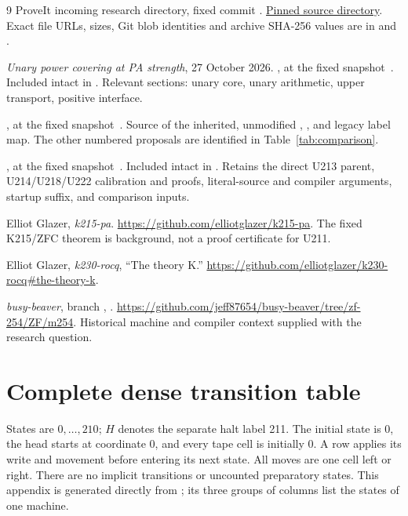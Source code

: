 \documentclass[11pt,a4paper]{article}
\begin{document}
\begin{thebibliography}{9}
 ProveIt incoming research directory, fixed commit
.
\href{https://github.com/VladimirReshetnikov/ProveIt/tree/9d50bf3df8c9e14941b549945c4f8400172d81f4/docs/incoming}{Pinned source directory}.
Exact file URLs, sizes, Git blob identities and archive SHA-256 values are in
 and .

 \emph{Unary power covering at PA strength}, 27 October 2026.
, at the fixed snapshot~\cite{snapshot}.
Included intact in .
Relevant sections: unary core, unary arithmetic, upper transport, positive interface.

 ,
at the fixed snapshot~\cite{snapshot}. Source of the inherited, unmodified
, , and legacy label map.
The other numbered proposals are identified in Table~\ref{tab:comparison}.

 ,
at the fixed snapshot~\cite{snapshot}. Included intact in .
Retains the direct U213 parent, U214/U218/U222 calibration and proofs,
literal-source and compiler arguments, startup suffix, and comparison inputs.

 Elliot Glazer, \emph{k215-pa}.
\url{https://github.com/elliotglazer/k215-pa}.
The fixed K215/ZFC theorem is background, not a proof certificate for U211.

 Elliot Glazer, \emph{k230-rocq}, ``The theory K.''
\url{https://github.com/elliotglazer/k230-rocq#the-theory-k}.

 \emph{busy-beaver}, branch , .
\url{https://github.com/jeff87654/busy-beaver/tree/zf-254/ZF/m254}.
Historical machine and compiler context supplied with the research question.
\end{thebibliography}

\clearpage
\appendix
\section{Complete dense transition table}
\label{sec:table}
States are $0,\ldots,210$; $H$ denotes the separate halt label 211.
The initial state is 0, the head starts at coordinate 0, and every tape cell
is initially 0. A row applies its write and movement before entering its
next state. All moves are one cell left or right. There are no implicit
transitions or uncounted preparatory states. This appendix is generated
directly from ; its three groups of columns list the
states of one machine.

\end{document}
